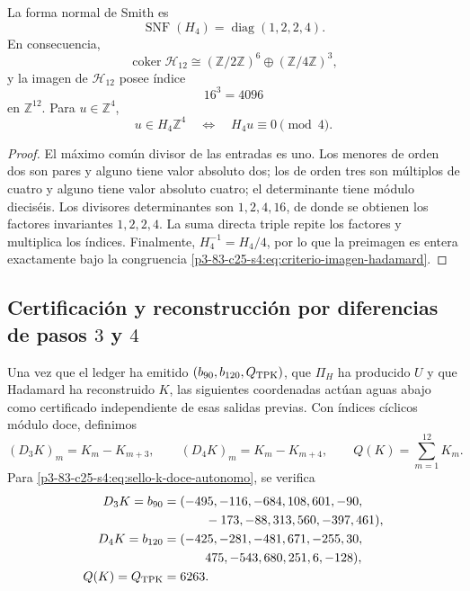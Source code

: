 \begin{theorem}
\label{p3-83-c25-s4:thm:smith-hadamard-autonomo}
La forma normal de Smith es
\begin{equation}
 \operatorname{SNF}(H_4)=\operatorname{diag}(1,2,2,4).
 \label{p3-83-c25-s4:eq:snf-hadamard-autonoma}
\end{equation}
En consecuencia,
\begin{equation}
 \operatorname{coker}\mathcal H_{12}
 \cong(\mathbb Z/2\mathbb Z)^6
 \oplus(\mathbb Z/4\mathbb Z)^3,
 \label{p3-83-c25-s4:eq:cociente-hadamard-doce}
\end{equation}
y la imagen de \(\mathcal H_{12}\) posee índice
\[
 16^3=4096
\]
en \(\mathbb Z^{12}\). Para \(u\in\mathbb Z^4\),
\begin{equation}
 u\in H_4\mathbb Z^4
 \quad\Longleftrightarrow\quad
 H_4u\equiv0\pmod4.
 \label{p3-83-c25-s4:eq:criterio-imagen-hadamard}
\end{equation}
\end{theorem}

\begin{proof}
El máximo común divisor de las entradas es uno. Los menores de orden dos son
pares y alguno tiene valor absoluto dos; los de orden tres son múltiplos de
cuatro y alguno tiene valor absoluto cuatro; el determinante tiene módulo
dieciséis. Los divisores determinantes son \(1,2,4,16\), de donde se obtienen
los factores invariantes \(1,2,2,4\). La suma directa triple repite los
factores y multiplica los índices. Finalmente,
\(H_4^{-1}=H_4/4\), por lo que la preimagen es entera exactamente bajo la
congruencia \eqref{p3-83-c25-s4:eq:criterio-imagen-hadamard}.
\end{proof}

\subsection{Certificación y reconstrucción por diferencias de pasos \(3\) y \(4\)}

Una vez que el ledger ha emitido \((b_{90},b_{120},Q_{\rm TPK})\), que
\(\Pi_H\) ha producido \(U\) y que Hadamard ha reconstruido \(K\), las
siguientes coordenadas actúan aguas abajo como certificado independiente de
esas salidas previas. Con índices cíclicos módulo doce, definimos
\begin{equation}
 (D_3K)_m=K_m-K_{m+3},
 \qquad
 (D_4K)_m=K_m-K_{m+4},
 \qquad
 Q(K)=\sum_{m=1}^{12}K_m.
 \label{p3-83-c25-s4:eq:extractor-diferencias-k}
\end{equation}
Para \eqref{p3-83-c25-s4:eq:sello-k-doce-autonomo}, se verifica
\begin{align*}
 D_3K=b_{90}={}&(-495,-116,-684,108,601,-90,\\
         &\qquad-173,-88,313,560,-397,461),\\
 D_4K=b_{120}={}&(-425,-281,-481,671,-255,30,\\
         &\qquad475,-543,680,251,6,-128),\\
 Q(K)=Q_{\rm TPK}={}&6263.
\end{align*}

